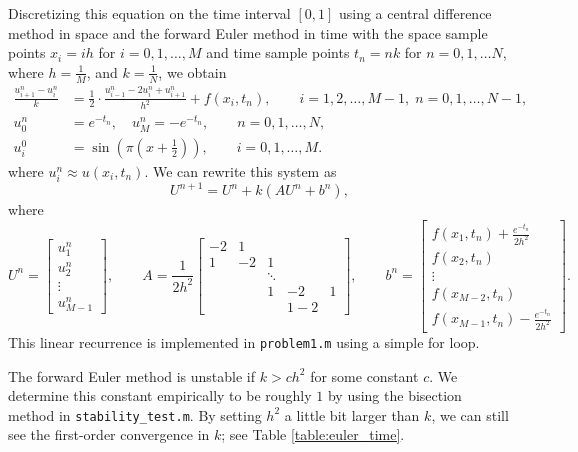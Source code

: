\documentclass{homework}
\begin{document}
	\begin{alphaparts}
		\questionpart
		Discretizing this equation on the time interval $[0,1]$ using a central difference method in space and the forward Euler method in time with the space sample points $x_i = ih$ for $i =0,1,\dots, M$ and time sample points $t_n = nk$ for $n=0,1,\dots N$, where $h = \frac{1}{M}$, and $k = \frac{1}{N}$, we obtain
		\begin{align*}
			\frac{u^n_{i+1} - u^n_i}{k} &= \frac{1}{2}\cdot\frac{u^n_{i-1}-2u^n_i + u^n_{i+1}}{h^2} + f(x_i,t_n), \qquad i =1,2,\dots, M-1, \; n = 0,1,\dots, N-1,\\
			u^n_0 &= e^{-t_n}, \quad u^n_{M} = -e^{-t_n}, \qquad n = 0,1,\dots, N,\\
			u^0_i &= \sin\left(\pi\left(x+\frac{1}{2}\right)\right), \qquad i = 0,1,\dots, M.
		\end{align*}
		where $u^n_i \approx u(x_i, t_n)$. We can rewrite this system as
		\begin{equation*}
			U^{n+1} = U^n + k(AU^n + b^n),
		\end{equation*}
		where
		\begin{equation*}
			U^n = \left[\begin{matrix}u^n_1 \\ u^n_2 \\ \vdots \\ u^n_{M-1}\end{matrix}\right], \qquad A = \frac{1}{2h^2}\left[\begin{matrix}
				-2 & 1 \\
				1 & -2 & 1 \\ 
				& & \ddots \\
				& & 1 & -2 & 1 \\
				& & & 1 - 2
			\end{matrix}\right], \qquad
			b^n = \left[\begin{matrix}
				f(x_1,t_n) + \frac{e^{-t_n}}{2h^2} \\
				f(x_2,t_n) \\
				\vdots
				\\
				f(x_{M-2}, t_n) \\
				f(x_{M-1}, t_n) - \frac{e^{-t_n}}{2h^2}
			\end{matrix}\right].
		\end{equation*}
		This linear recurrence is implemented in \verb*|problem1.m| using a simple for loop.
		
		\questionpart The forward Euler method is unstable if $k > ch^2$ for some constant $c$. We determine this constant empirically to be roughly $1$ by using the bisection method in \verb*|stability_test.m|. By setting $h^2$ a little bit larger than $k$, we can still see the first-order convergence in $k$; see Table \ref{table:euler_time}.
		

\end{alphaparts}
\end{document}

